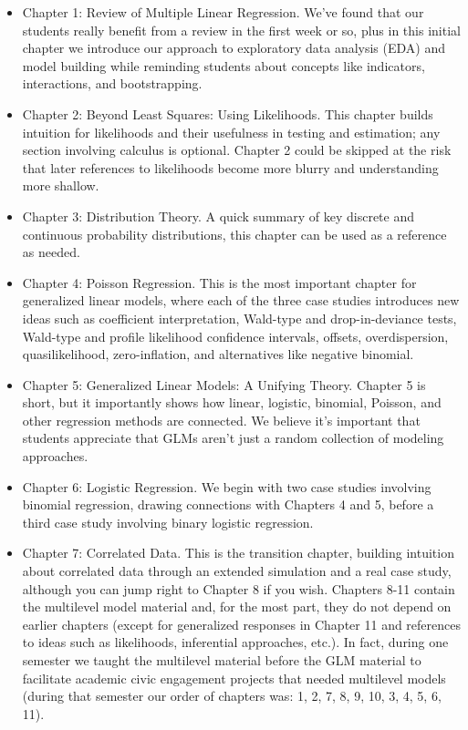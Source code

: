 \documentclass[
]{krantz}
\providecommand{\tightlist}{%
  \setlength{\itemsep}{0pt}\setlength{\parskip}{0pt}}
\begin{document}
\begin{itemize}
\tightlist
\item
  Chapter 1: Review of Multiple Linear Regression. We've found that our students really benefit from a review in the first week or so, plus in this initial chapter we introduce our approach to exploratory data analysis (EDA) and model building while reminding students about concepts like indicators, interactions, and bootstrapping.
\item
  Chapter 2: Beyond Least Squares: Using Likelihoods. This chapter builds intuition for likelihoods and their usefulness in testing and estimation; any section involving calculus is optional. Chapter 2 could be skipped at the risk that later references to likelihoods become more blurry and understanding more shallow.
\item
  Chapter 3: Distribution Theory. A quick summary of key discrete and continuous probability distributions, this chapter can be used as a reference as needed.
\item
  Chapter 4: Poisson Regression. This is the most important chapter for generalized linear models, where each of the three case studies introduces new ideas such as coefficient interpretation, Wald-type and drop-in-deviance tests, Wald-type and profile likelihood confidence intervals, offsets, overdispersion, quasilikelihood, zero-inflation, and alternatives like negative binomial.
\item
  Chapter 5: Generalized Linear Models: A Unifying Theory. Chapter 5 is short, but it importantly shows how linear, logistic, binomial, Poisson, and other regression methods are connected. We believe it's important that students appreciate that GLMs aren't just a random collection of modeling approaches.
\item
  Chapter 6: Logistic Regression. We begin with two case studies involving binomial regression, drawing connections with Chapters 4 and 5, before a third case study involving binary logistic regression.
\item
  Chapter 7: Correlated Data. This is the transition chapter, building intuition about correlated data through an extended simulation and a real case study, although you can jump right to Chapter 8 if you wish. Chapters 8-11 contain the multilevel model material and, for the most part, they do not depend on earlier chapters (except for generalized responses in Chapter 11 and references to ideas such as likelihoods, inferential approaches, etc.). In fact, during one semester we taught the multilevel material before the GLM material to facilitate academic civic engagement projects that needed multilevel models (during that semester our order of chapters was: 1, 2, 7, 8, 9, 10, 3, 4, 5, 6, 11).

\end{itemize}
\end{document}
